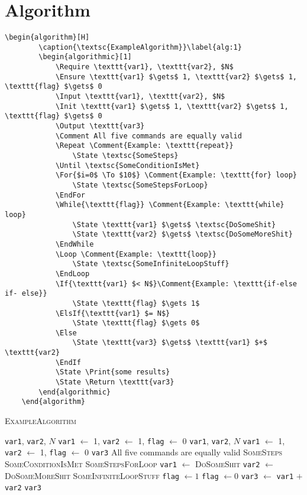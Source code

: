 \documentclass{article}
\begin{document}
	
	\newpage
	\section{Algorithm}\label{sec:algo}
	\begin{Verbatim}[tabsize=4]
	\begin{algorithm}[H]
		\caption{\textsc{ExampleAlgorithm}}\label{alg:1}
		\begin{algorithmic}[1]
			\Require \texttt{var1}, \texttt{var2}, $N$ 
			\Ensure \texttt{var1} $\gets$ 1, \texttt{var2} $\gets$ 1, \texttt{flag} $\gets$ 0 
			\Input \texttt{var1}, \texttt{var2}, $N$
			\Init \texttt{var1} $\gets$ 1, \texttt{var2} $\gets$ 1, \texttt{flag} $\gets$ 0 
			\Output \texttt{var3}
			\Comment All five commands are equally valid
			\Repeat \Comment{Example: \texttt{repeat}}
				\State \textsc{SomeSteps}
			\Until \textsc{SomeConditionIsMet}	
			\For{$i=0$ \To $10$} \Comment{Example: \texttt{for} loop}
				\State \textsc{SomeStepsForLoop}
			\EndFor
			\While{\texttt{flag}} \Comment{Example: \texttt{while} loop}
				\State \texttt{var1} $\gets$ \textsc{DoSomeShit}
				\State \texttt{var2} $\gets$ \textsc{DoSomeMoreShit}
			\EndWhile
			\Loop \Comment{Example: \texttt{loop}}
				\State \textsc{SomeInfiniteLoopStuff}
			\EndLoop
			\If{\texttt{var1} $< N$}\Comment{Example: \texttt{if-else if- else}}
				\State \texttt{flag} $\gets 1$
			\ElsIf{\texttt{var1} $= N$}
				\State \texttt{flag} $\gets 0$
			\Else
				\State \texttt{var3} $\gets$ \texttt{var1} $+$ \texttt{var2}
			\EndIf
			\State \Print{some results}
			\State \Return \texttt{var3}
		\end{algorithmic}
	\end{algorithm}
	\end{Verbatim}
	\begin{algorithm}[H]
		\caption{\textsc{ExampleAlgorithm}}\label{alg:1}
		\begin{algorithmic}[1]
			\Require \texttt{var1}, \texttt{var2}, $N$ 
			\Ensure \texttt{var1} $\gets$ 1, \texttt{var2} $\gets$ 1, \texttt{flag} $\gets$ 0 
			\Input \texttt{var1}, \texttt{var2}, $N$
			\Init \texttt{var1} $\gets$ 1, \texttt{var2} $\gets$ 1, \texttt{flag} $\gets$ 0 
			\Output \texttt{var3}
			\Comment All five commands are equally valid
			\Repeat {}
				\State \textsc{SomeSteps}
			\Until \textsc{SomeConditionIsMet}	
			 
				\State \textsc{SomeStepsForLoop}
			\EndFor
			 
				\State \texttt{var1} $\gets$ \textsc{DoSomeShit}
				\State \texttt{var2} $\gets$ \textsc{DoSomeMoreShit}
			\EndWhile
			\Loop {}
				\State \textsc{SomeInfiniteLoopStuff}
			\EndLoop
				\State \texttt{flag} $\gets 1$
				\State \texttt{flag} $\gets 0$
			\Else
				\State \texttt{var3} $\gets$ \texttt{var1} $+$ \texttt{var2}
			\EndIf
			\State {}
			\State \Return \texttt{var3}
		\end{algorithmic}
	\end{algorithm}
	
\end{document}
